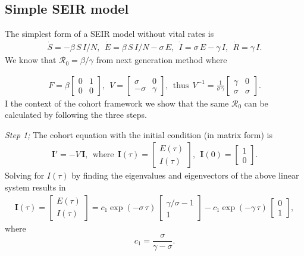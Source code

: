 \documentclass[12pt]{article}
\newcommand{\R}{\ensuremath{\mathcal{R}_0}}
\renewcommand{\vec}[1]{\ensuremath{\mathbf{#1}}} %
\theoremstyle{definition} %
\begin{document}
\subsection{Simple SEIR model}
The simplest form of a SEIR model without vital rates is 
\begin{align}\label{mo:sier1}
\dot S=-\beta\,S\,I/N,~~
\dot E= \beta\,S\,I/N -\sigma\,E,~~
\dot I= \sigma\,E -\gamma\,I,~~
\dot R= \gamma\,I.
\end{align}
We know that $\R=\beta/\gamma$ from next generation method where 

\begin{align}
\label{seir1FV}
F = \beta \left[ \begin {array}{cc} 
0 & 1 \\
0 & 0
 \end {array} \right],~~
V=
 \left[ \begin {array}{cc}
 \sigma & 0 \\
-\sigma & \gamma
\end {array} \right],
~~ \text{thus}~~
V^{-1} = \frac{1}{\sigma\,\gamma}
\left[ \begin {array}{cc}
\gamma & 0 \\
\sigma & \sigma
\end {array} \right].
\end{align}
I the context of the cohort framework we show that the same $\R$ can be calculated by following the three steps.

{\it Step 1;} The cohort equation with the initial condition (in matrix form) is 
\begin{align}
\vec I'=-V\,\vec I,~~ \text{where}~~ \vec I(\tau)=\left[ \begin {array}{c} E(\tau)\\I(\tau) \end {array} \right], ~~
\vec I(0)=\left[ \begin {array}{c} 1\\0 \end {array} \right].
\end{align}
Solving for $I(\tau)$ by finding the eigenvalues and eigenvectors of the above linear system results in
\begin{align}
\vec I(\tau) = \left[ \begin {array}{c} E(\tau)\\I(\tau) \end {array} \right] =
c_1 \exp(-\sigma\,\tau)\,\left[ \begin {array}{c} \gamma/\sigma-1\\1 \end {array} \right] 
-c_1 \exp(-\gamma\,\tau)\,\left[ \begin {array}{c} 0\\1 \end {array} \right],
\end{align}
where $$c_1=\frac{\sigma}{\gamma-\sigma}.$$
\end{document}
